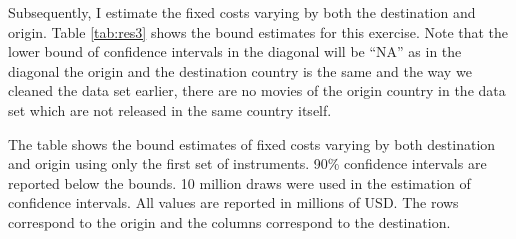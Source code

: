 \documentclass[11pt, letterpaper]{article} \usepackage{amsmath}
\newcommand{\floatintro}[1]{
  
  \vspace*{0.1in}
  
  {\footnotesize

    #1
    
  }
  
  \vspace*{0.1in} } \newcommand{\Hline}{\noindent\rule{18cm}{0.5pt}}
\begin{document}
Subsequently, I estimate the fixed costs varying by both the
destination and origin. Table \ref{tab:res3} shows the bound estimates
for this exercise. Note that the lower bound of confidence intervals
in the diagonal will be ``NA'' as in the diagonal the origin and the
destination country is the same and the way we cleaned the data set
earlier, there are no movies of the origin country in the data set
which are not released in the same country itself.
\begin{table}[htbp!]
  \floatintro{The table shows the bound estimates of fixed costs
    varying by both destination and origin using only the first set of
    instruments. 90\% confidence intervals are reported below the
    bounds. 10 million draws were used in the estimation of confidence
    intervals. All values are reported in millions of USD. The rows correspond to the
    origin and the columns correspond to the destination.}
  \centering
  \caption{Bound estimates of fixed costs varying by origin and
    destination (in million USD)}
  \label{tab:res3}
\end{table}
\end{document}
